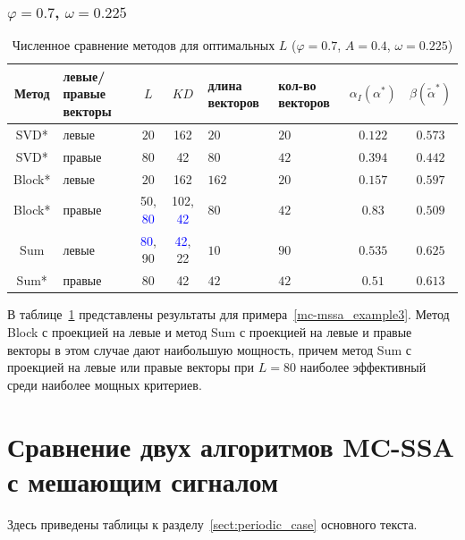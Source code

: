 \documentclass[specialist,
substylefile = spbu.rtx,
               subf,href,colorlinks=true,12pt]{disser}
\theoremstyle{definition}
\begin{document}
\subsubsection{$\varphi=0.7$, $\omega=0.225$}
\begin{table}[h]
	\caption{Численное сравнение методов для оптимальных $L$ ($\varphi=0.7$, $A=0.4$, $\omega=0.225$)}
	\label{tab:res_mc-mssa_omega0225}
	\centering
	\begin{tabular}{|c>{\centering\arraybackslash}m{1in}cc>{\centering\arraybackslash}m{1in} >{\centering\arraybackslash}m{0.8in}cc|}\hline
		Метод & левые/правые векторы & $L$ & $KD$ & длина векторов & кол-во векторов & $\alpha_I(\alpha^*)$ & $\beta(\widetilde{\alpha}^*)$ \\
		\hline
		SVD* & левые & $20$ & 162 & $20$ & $20$ & $0.122$ & $0.573$ \\
		\hline
		SVD* & правые & $80$ & 42 & $80$ & $42$ & $0.394$ & $0.442$ \\
		\hline
		Block* & левые & $20$ & 162 & $162$ & $20$ & $0.157$ & $\mathbf{0.597}$ \\
		\hline
		Block* & правые & 50, \textcolor{blue}{80} & 102, \textcolor{blue}{42} & $80$ & $42$ & $0.83$ & $0.509$\\
		\hline
		Sum & левые & \textcolor{blue}{80}, 90 & \textcolor{blue}{42}, 22 & $10$ & $90$ & $0.535$ & $\mathbf{0.625}$ \\
		\hline
		Sum* & правые & $80$ & 42 & $42$ & $42$ & $0.51$ & $\mathbf{0.613}$ \\
		\hline
	\end{tabular}
\end{table}
В таблице~\ref{tab:res_mc-mssa_omega0225} представлены результаты для примера~\ref{mc-mssa_example3}. Метод Block с проекцией на левые и метод Sum с проекцией на левые и правые векторы в этом случае дают наибольшую мощность, причем метод Sum с проекцией на левые или правые векторы при $L=80$ наиболее эффективный среди наиболее мощных критериев.

\section{Сравнение двух алгоритмов MC-SSA с мешающим сигналом}\label{appendix:mc-ssa_nuisance_comp_tables}
Здесь приведены таблицы к разделу~\ref{sect:periodic_case} основного текста.
\end{document}
